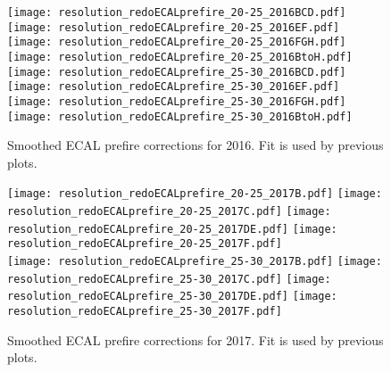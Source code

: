 \documentclass[landscape,10pt]{beamer} %
\newcommand{\commentout}[1]{}
\begin{document}
\newpage
\begin{figure}[p]
\centering
\texttt{[image: resolution\_redoECALprefire\_20-25\_2016BCD.pdf]}
\texttt{[image: resolution\_redoECALprefire\_20-25\_2016EF.pdf]}
\texttt{[image: resolution\_redoECALprefire\_20-25\_2016FGH.pdf]}
\texttt{[image: resolution\_redoECALprefire\_20-25\_2016BtoH.pdf]}\\
\texttt{[image: resolution\_redoECALprefire\_25-30\_2016BCD.pdf]}
\texttt{[image: resolution\_redoECALprefire\_25-30\_2016EF.pdf]}
\texttt{[image: resolution\_redoECALprefire\_25-30\_2016FGH.pdf]}
\texttt{[image: resolution\_redoECALprefire\_25-30\_2016BtoH.pdf]}
\caption{Smoothed ECAL prefire corrections for 2016. Fit is used by previous plots.}
\end{figure}

\newpage
\begin{figure}[p]
\centering
\texttt{[image: resolution\_redoECALprefire\_20-25\_2017B.pdf]}
\texttt{[image: resolution\_redoECALprefire\_20-25\_2017C.pdf]}
\texttt{[image: resolution\_redoECALprefire\_20-25\_2017DE.pdf]}
\texttt{[image: resolution\_redoECALprefire\_20-25\_2017F.pdf]}\\
\texttt{[image: resolution\_redoECALprefire\_25-30\_2017B.pdf]}
\texttt{[image: resolution\_redoECALprefire\_25-30\_2017C.pdf]}
\texttt{[image: resolution\_redoECALprefire\_25-30\_2017DE.pdf]}
\texttt{[image: resolution\_redoECALprefire\_25-30\_2017F.pdf]}
\caption{Smoothed ECAL prefire corrections for 2017. Fit is used by previous plots.}
\end{figure}

\commentout{
\newpage
\begin{figure}[p]
\centering
  \texttt{[image: resolution\_interpol\_datamc\_Run1.pdf]}
  \texttt{[image: resolution\_interpol\_datamc\_Run2016.pdf]}
  \texttt{[image: resolution\_interpol\_datamc\_Run2017.pdf]}
  \texttt{[image: resolution\_interpol\_datamc\_Run2018.pdf]}\\
  \texttt{[image: resolution\_interpol\_Run1.pdf]}
  \texttt{[image: resolution\_interpol\_Run2016.pdf]}
  \texttt{[image: resolution\_interpol\_Run2017.pdf]}
  \texttt{[image: resolution\_interpol\_Run2018.pdf]}
\caption{Rebinned JER scale factors (top). These are be used to scale MC truth JER derived in inclusive jet rapidity bins (top).}
\end{figure}
} %
\end{document}
